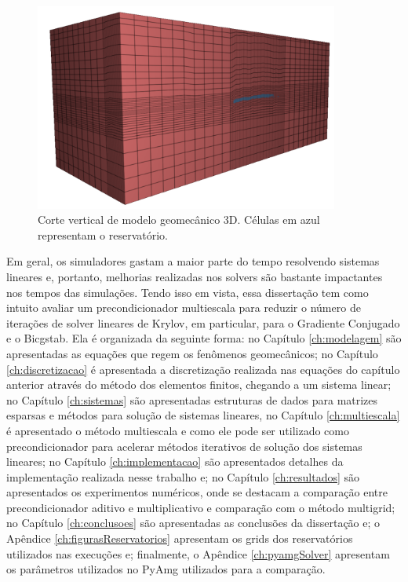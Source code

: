 \begin{figure}[!htbp]
\centering
\includegraphics[width=10cm]{chap00/figs/Geresim(0054).png}
\caption{Corte vertical de modelo geomecânico 3D. Células em azul representam o reservatório.}
\label{fig:modelogeomec3d}
\end{figure}

Em geral, os simuladores gastam a maior parte do tempo resolvendo sistemas lineares e, portanto, melhorias realizadas nos solvers são bastante impactantes nos tempos das simulações. Tendo isso em vista, essa dissertação tem como intuito avaliar um precondicionador multiescala para reduzir o número de iterações de solver lineares de Krylov, em particular, para o Gradiente Conjugado e o Bicgstab. Ela é organizada da seguinte forma: no Capítulo \ref{ch:modelagem} são apresentadas as equações que regem os fenômenos geomecânicos; no Capítulo \ref{ch:discretizacao} é apresentada a discretização realizada nas equações do capítulo anterior através do método dos elementos finitos, chegando a um sistema linear; no Capítulo \ref{ch:sistemas} são apresentadas estruturas de dados para matrizes esparsas e métodos para solução de sistemas lineares, no Capítulo \ref{ch:multiescala} é apresentado o método multiescala e como ele pode ser utilizado como precondicionador para acelerar métodos iterativos de solução dos sistemas lineares; no Capítulo \ref{ch:implementacao} são apresentados detalhes da implementação realizada nesse trabalho e; no Capítulo \ref{ch:resultados} são apresentados os experimentos numéricos, onde se destacam a comparação entre precondicionador aditivo e multiplicativo e comparação com o método multigrid; no Capítulo \ref{ch:conclusoes} são apresentadas as conclusões da dissertação e; o Apêndice \ref{ch:figurasReservatorios} apresentam os grids dos reservatórios utilizados nas execuções e; finalmente, o Apêndice \ref{ch:pyamgSolver} apresentam os parâmetros utilizados no PyAmg utilizados para a comparação.



